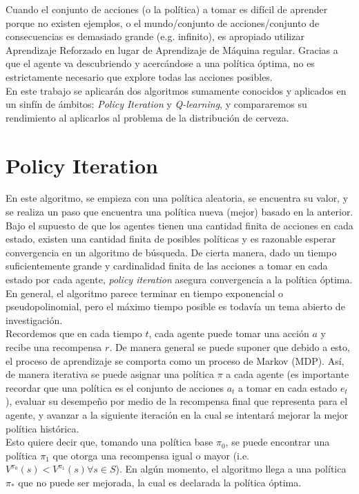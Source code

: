 Cuando el conjunto de acciones (o la pol\'itica) a tomar es dif\'icil de aprender porque no existen ejemplos, o el mundo/conjunto de acciones/conjunto de consecuencias es demasiado grande (e.g. infinito), es apropiado utilizar Aprendizaje Reforzado en lugar de Aprendizaje de M\'aquina regular. Gracias a que el agente va descubriendo y acerc\'andose a una pol\'itica \'optima, no es estrictamente necesario que explore todas las acciones posibles. \\

En este trabajo se aplicar\'an dos algoritmos sumamente conocidos y aplicados en un sinf\'in de \'ambitos: \textit{Policy Iteration} y \textit{Q-learning}, y compararemos su rendimiento al aplicarlos al problema de la distribuci\'on de cerveza.

\section{Policy Iteration}

En este algoritmo, se empieza con una pol\'itica aleatoria, se encuentra su valor, y se realiza un paso que encuentra una pol\'itica nueva (mejor) basado en la anterior. Bajo el supuesto de que los agentes tienen una cantidad finita de acciones en cada estado, existen una cantidad finita de posibles pol\'iticas y es razonable esperar convergencia en un algoritmo de b\'usqueda. De cierta manera, dado un tiempo suficientemente grande y cardinalidad finita de las acciones a tomar en cada estado por cada agente, \textit{policy iteration} asegura convergencia a la pol\'itica \'optima. En general, el algoritmo parece terminar en tiempo exponencial o pseudopolinomial, pero el m\'aximo tiempo posible es todav\'ia un tema abierto de investigaci\'on.\\

Recordemos que en cada tiempo $t$, cada agente puede tomar una acci\'on $a$ y recibe una recompensa $r$. De manera general se puede suponer que debido a esto, el proceso de aprendizaje se comporta como un proceso de Markov (MDP). As\'i, de manera iterativa se puede asignar una pol\'itica $\pi$ a cada agente (es importante recordar que una pol\'itica es el conjunto de acciones $a_t$ a tomar en cada estado $e_t$), evaluar su desempe\~no por medio de la recompensa final que representa para el agente, y avanzar a la siguiente iteraci\'on en la cual se intentar\'a mejorar la mejor pol\'itica hist\'orica.\\

Esto quiere decir que, tomando una pol\'itica base $\pi_0$, se puede encontrar una pol\'itica $\pi_1$ que otorga una recompensa igual o mayor (i.e. $V^{\pi_0}(s)<V^{\pi_1}(s) \forall s \in S$). En alg\'un momento, el algoritmo llega a una pol\'itica $\pi_{*}$ que no puede ser mejorada, la cual es declarada la pol\'itica \'optima.\\


